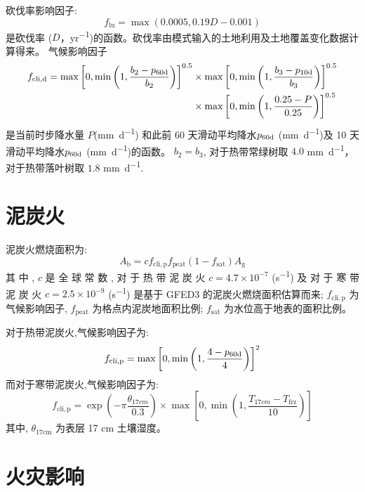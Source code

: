 砍伐率影响因子:
\begin{equation}
  f_{\mathrm{lu}} = \max(0.0005, 0.19D - 0.001)
\end{equation}
是砍伐率 ($D$，\unit{yr^{-1}})的函数。砍伐率由模式输入的土地利用及土地覆盖变化数据计算得来。
气候影响因子
\begin{equation}
  \begin{aligned}
    f_{\mathrm{c l i, d}}=\max\left[0, \min \left(1, \frac{b_{2}-p_{\rm 60d}}{b_{2}}\right)\right]^{0.5}& \times\max\left[0, \min \left(1, \frac{b_{3}-p_{\rm 10d}}{b_{3}}\right)\right]^{0.5}\\
    & \times\max\left[0, \min \left(1, \frac{0.25-P}{0.25}\right)\right]^{0.5}
  \end{aligned}
\end{equation}
是当前时步降水量 $P$(\unit{mm.d^{-1}}) 和此前 60 天滑动平均降水$p_{\rm 60d}$ (\unit{mm.d^{-1}})及 10 天滑动平均降水$p_{\rm 60d}$ (\unit{mm.d^{-1}})的函数。 $b_2 = b_3$, 对于热带常绿树取 $4.0$ \unit{mm.d^{-1}}，对于热带落叶树取 $1.8$ \unit{mm.d^{-1}}.


\section{泥炭火}

泥炭火燃烧面积为:
\begin{equation}
  A_{\mathrm{b}}=c f_{\mathrm{c l i, p}} f_{\mathrm{peat}}\left(1-f_{\mathrm{sat}}\right) A_{\mathrm{g}}
\end{equation}
其 中 , $c$ 是 全 球 常 数 , 对 于 热 带 泥 炭 火 $c=4.7\times10^{-7}$ (\unit{s^{-1}}) 及 对 于 寒 带 泥 炭 火 $c=2.5\times10^{-9}$ (\unit{s^{-1}}) 是基于 GFED3 的泥炭火燃烧面积估算而来; $f_{\mathrm{cli,p}}$ 为气候影响因子, $f_{\mathrm{peat}}$ 为格点内泥炭地面积比例; $f_{\mathrm{sat}}$ 为水位高于地表的面积比例。

对于热带泥炭火,气候影响因子为:
\begin{equation}
  f_{\mathrm{c l i, p}}=\max \left[0, \min \left(1, \frac{4-p_{\rm 60d}}{4}\right)\right]^{2}
\end{equation}
而对于寒带泥炭火,气候影响因子为:
\begin{equation}
  f_{\mathrm{c l i, p}}=\exp \left(-\pi \frac{\theta_{17 c m}}{0.3}\right) \times \max \left[0, \min \left(1, \frac{T_{17 c m}-T_{\mathrm{frz}}}{10}\right)\right]
\end{equation}
其中, $\theta_{\text{17cm}}$ 为表层 17 cm 土壤湿度。

\section{火灾影响}
